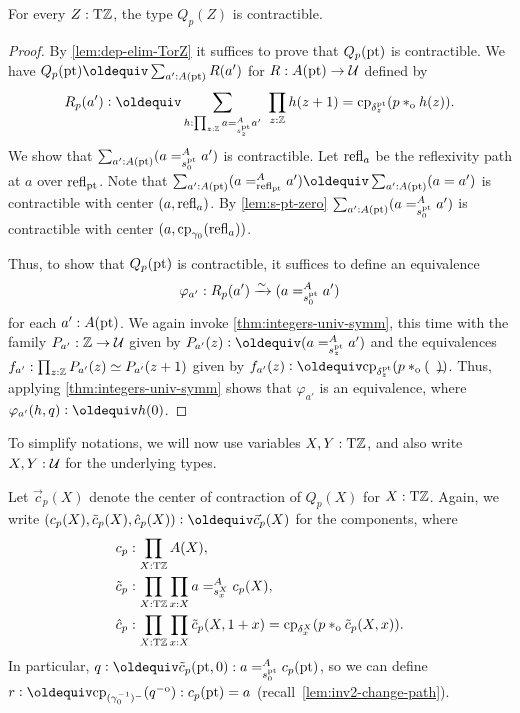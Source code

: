 \documentclass[a4paper,12pt]{amsart}
\begin{document}
\begin{lemma}\label{lem:guided-null-hmtps-dep}
  For every $Z:{\mathrm{T}\mathbb{Z}}$, the type $Q_p(Z)$ is contractible.
\end{lemma}
\begin{proof}
  By \cref{lem:dep-elim-TorZ} it suffices to prove that $Q_p({\mathord{\mathrm{pt}}})$ is contractible.
  We have $Q_p(\pt)\jdeq \sum_{a':A(\pt)} R(a')$ for $R : A({\mathord{\mathrm{pt}}}) \to \mathcal{U}$ defined by
  \[
    R_p(a') \defeq \sum_{h : \prod_{z:\zet} a =^A_{s^\pt_z} a'}~
    \prod_{z:\zet} h(z+1) = \cp{\delta^\pt_z}(p \cto h(z)).
  \]
  We show that $\sum_{a':A({\mathord{\mathrm{pt}}})} (a =^A_{s^{\mathord{\mathrm{pt}}}_0} {a'})$ is contractible.
  Let $\mathop{{\mathrm{refl}}_{a}}$ be the reflexivity path at $a$ over $\mathop{{\mathrm{refl}}_{{\mathord{\mathrm{pt}}}}}$.
  Note that $\sum_{a':A(\pt)} (a =^A_{\refl{\pt}} a') \jdeq \sum_{a':A(\pt)} (a = a')$
  is contractible with center $(a,\mathop{{\mathrm{refl}}_{a}})$. By \cref{lem:s-pt-zero}
  $\sum_{a':A({\mathord{\mathrm{pt}}})} (a =^A_{s^{\mathord{\mathrm{pt}}}_0} {a'})$ is contractible with center
  $(a,\mathrm{cp}_{\gamma_0}(\mathop{{\mathrm{refl}}_{a}}))$.

  Thus, to show that $Q_p({\mathord{\mathrm{pt}}})$ is contractible,
  it suffices to define an equivalence
  \[
    \varphi_{a'} : R_p(a') \xrightarrow{\sim}{} (a =^A_{s^{\mathord{\mathrm{pt}}}_0} {a'})
  \]
  for each $a' : A({\mathord{\mathrm{pt}}})$.
  We again invoke \cref{thm:integers-univ-symm},
  this time with the family $P_{a'} : \mathbb{Z} \to \mathcal{U}$ given
  by $P_{a'}(z) \defeq (a =^A_{s^\pt_z} {a'})$
  and the equivalences $f_{a'} : \prod_{z:\mathbb{Z}} P_{a'}(z)\simeq P_{a'}(z+1)$
  given by $f_{a'}(z) \defeq \cp{\delta^\pt_z}(p \cto (\blank))$.
  Thus, applying \cref{thm:integers-univ-symm}
  shows that $\varphi_{a'}$ is an equivalence,
  where $\varphi_{a'}(h,q) \defeq h(0)$.
\end{proof}

To simplify notations, we will now use variables $X,Y:{\mathrm{T}\mathbb{Z}}$,
and also write $X,Y:\mathcal{U}$ for the underlying types.

Let $\vec c_p(X)$ denote the center of contraction of $Q_p(X)$ for $X:{\mathrm{T}\mathbb{Z}}$.
Again, we write $(c_p(X),\tilde{c}_p(X),\hat{c}_p(X))\defeq\vec{c}_p(X)$
for the components, where
\begin{align*}
         c_p &: \prod_{X:{\mathrm{T}\mathbb{Z}}} A(X),\\
  \tilde c_p &: \prod_{X:{\mathrm{T}\mathbb{Z}}}\prod_{x:X} a =^A_{s^X_x} c_p(X), \\
    \hat c_p &: \prod_{X:{\mathrm{T}\mathbb{Z}}}\prod_{x:X} \tilde c_p(X,1+x)
               = \mathrm{cp}_{\delta^X_x}(p \mathbin{*_{\mathrm{o}}} \tilde c_p(X,x)).
\end{align*}
In particular, $q\defeq \tilde c_p(\pt,0) : a =^A_{s^\pt_0} c_p(\pt)$,
so we can define $r\defeq \cp{(\gamma_0^{-1})^-}(q\invo) : c_p(\pt) = a$
(recall~\cref{lem:inv2-change-path}).
\end{document}
